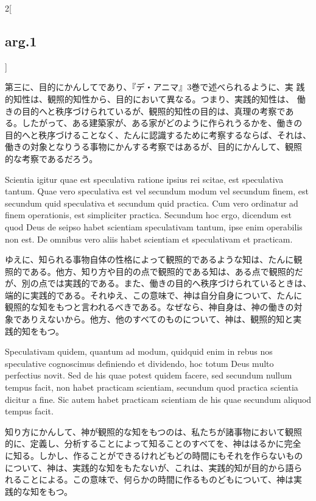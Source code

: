 \documentclass[paper=a4paper,fontsize=10pt,jafontsize=9pt,titlepage]{jlreq}
\begin{document}
\begin{paracol}{2}[\subsection{arg.1}]
\switchcolumn

第三に、目的にかんしてであり、『デ・アニマ』3巻で述べられるように、実
践的知性は、観照的知性から、目的において異なる。つまり、実践的知性は、
働きの目的へと秩序づけられているが、観照的知性の目的は、真理の考察であ
る。したがって、ある建築家が、ある家がどのように作られうるかを、働きの
目的へと秩序づけることなく、たんに認識するために考察するならば、それは、
働きの対象となりうる事物にかんする考察ではあるが、目的にかんして、観照
的な考察であるだろう。

\switchcolumn*

Scientia igitur quae est speculativa ratione ipsius rei scitae, est
speculativa tantum. Quae vero speculativa est vel secundum modum vel
secundum finem, est secundum quid speculativa et secundum quid
practica. Cum vero ordinatur ad finem operationis, est simpliciter
practica. Secundum hoc ergo, dicendum est quod Deus de seipso habet
scientiam speculativam tantum, ipse enim operabilis non est. De
omnibus vero aliis habet scientiam et speculativam et practicam.

\switchcolumn

ゆえに、知られる事物自体の性格によって観照的であるような知は、たんに観
照的である。他方、知り方や目的の点で観照的である知は、ある点で観照的だ
が、別の点では実践的である。また、働きの目的へ秩序づけられているときは、
端的に実践的である。それゆえ、この意味で、神は自分自身について、たんに
観照的な知をもつと言われるべきである。なぜなら、神自身は、神の働きの対
象でありえないから。他方、他のすべてのものについて、神は、観照的知と実
践的知をもつ。

\switchcolumn*

Speculativam quidem, quantum ad modum, quidquid enim in rebus nos
speculative cognoscimus definiendo et dividendo, hoc totum Deus multo
perfectius novit. Sed de his quae potest quidem facere, sed secundum
nullum tempus facit, non habet practicam scientiam, secundum quod
practica scientia dicitur a fine. Sic autem habet practicam scientiam
de his quae secundum aliquod tempus facit.

\switchcolumn

知り方にかんして、神が観照的な知をもつのは、私たちが諸事物において観照
的に、定義し、分析することによって知ることのすべてを、神ははるかに完全
に知る。しかし、作ることができるけれどもどの時間にもそれを作らないもの
について、神は、実践的な知をもたないが、これは、実践的知が目的から語ら
れることによる。この意味で、何らかの時間に作るものどもについて、神は実
践的な知をもつ。

\switchcolumn*


\end{paracol}
\end{document}
